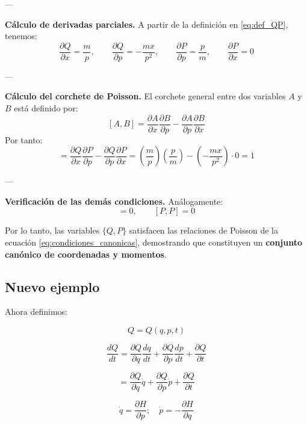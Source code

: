 \documentclass{article}
\begin{document}
---

\textbf{Cálculo de derivadas parciales.}  
A partir de la definición en \eqref{eq:def_QP}, tenemos:
\begin{equation}
\frac{\partial Q}{\partial x} = \frac{m}{p},
\qquad
\frac{\partial Q}{\partial p} = -\frac{mx}{p^{2}},
\qquad
\frac{\partial P}{\partial p} = \frac{p}{m},
\qquad
\frac{\partial P}{\partial x} = 0
\label{eq:partials}
\end{equation}

---

\textbf{Cálculo del corchete de Poisson.}  
El corchete general entre dos variables $A$ y $B$ está definido por:
\[
[A, B] = 
\frac{\partial A}{\partial x}\frac{\partial B}{\partial p}
- \frac{\partial A}{\partial p}\frac{\partial B}{\partial x}
\]
Por tanto:
\begin{equation}
[Q, P]
= \frac{\partial Q}{\partial x}\frac{\partial P}{\partial p}
- \frac{\partial Q}{\partial p}\frac{\partial P}{\partial x}
= \left(\frac{m}{p}\right)\left(\frac{p}{m}\right)
- \left(-\frac{mx}{p^{2}}\right)\cdot 0
= 1
\label{eq:QP}
\end{equation}

---

\textbf{Verificación de las demás condiciones.}  
Análogamente:
\begin{equation}
[Q, Q] = 0,
\qquad
[P, P] = 0
\label{eq:QQ_PP}
\end{equation}

Por lo tanto, las variables $\{Q, P\}$ satisfacen las relaciones de Poisson de la ecuación \eqref{eq:condiciones_canonicas}, demostrando que constituyen un \textbf{conjunto canónico de coordenadas y momentos}.


\subsection{Nuevo ejemplo}

Ahora definimos:


\[ Q = Q(q,p,t) \]

\[ \frac{dQ}{dt} = \frac{\partial Q}{\partial q} \frac{dq}{dt} + \frac{\partial Q}{\partial p} \frac{dp}{dt} + \frac{\partial Q}{\partial t}   \]

\[ = \frac{\partial Q}{\partial q} \dot{q} + \frac{\partial Q}{\partial p} \dot{p} + \frac{\partial Q}{\partial t} \]

\[ \dot{q} = \frac{\partial H}{\partial p}; \quad \dot{p} = -\frac{\partial H}{\partial q} \]
\end{document}
